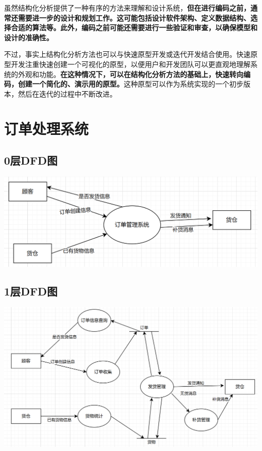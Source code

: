 \documentclass[11pt, a4paper, oneside]{ctexbook}
\begin{document}
虽然结构化分析提供了一种有序的方法来理解和设计系统，\textbf{但在进行编码之前，通常还需要进一步的设计和规划工作。这可能包括设计软件架构、定义数据结构、选择合适的算法等。此外，编码之前可能还需要进行一些验证和审查，以确保模型和设计的准确性。}

不过，事实上结构化分析方法也可以与快速原型开发或迭代开发结合使用。快速原型开发注重快速创建一个可视化的原型，以便用户和开发团队可以更直观地理解系统的外观和功能。\textbf{在这种情况下，可以在结构化分析方法的基础上，快速转向编码，创建一个简化的、演示用的原型。}这种原型可以作为系统实现的一个初步版本，然后在迭代的过程中不断改进。


\chapter{订单处理系统}

\section{0层DFD图}
\centering
\includegraphics[width=\textwidth]{1.png}
\label{fig:DFD0}

\newpage
\section{1层DFD图}
\centering
\includegraphics[width=\textwidth]{2.png}
\label{fig:DFD1}
\end{document}
